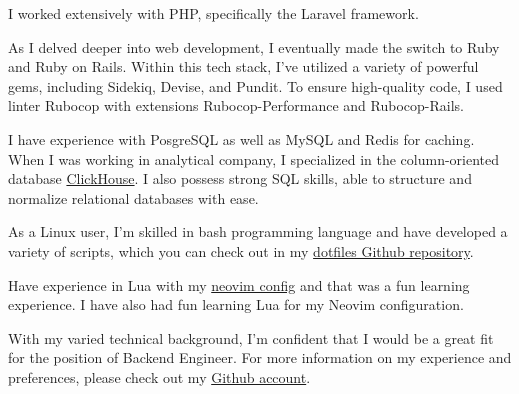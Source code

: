
\begin{cvparagraph}

I worked extensively with PHP, specifically the Laravel framework. 

As I delved deeper into web development, I eventually made the switch to Ruby and Ruby on Rails.
Within this tech stack, I've utilized a variety of powerful gems, including Sidekiq, Devise, and Pundit. 
To ensure high-quality code, I used linter Rubocop with extensions Rubocop-Performance and Rubocop-Rails.

I have experience with PosgreSQL as well as MySQL and Redis for caching.
When I was working in analytical company, I specialized in the column-oriented database \href{https://clickhouse.com/}{ClickHouse}.
I also possess strong SQL skills, able to structure and normalize relational databases with ease.

As a Linux user, I'm skilled in bash programming language and have developed a variety
of scripts, which you can check out in my \href{https://github.com/wittyjudge/dotfiles/tree/master/.local/bin}{dotfiles Github repository}.

Have experience in Lua with my \href{https://github.com/WIttyJudge/dotfiles/tree/master/.config/nvim}{neovim config} and that was a fun learning experience.
I have also had fun learning Lua for my Neovim configuration.

With my varied technical background, I'm confident that I would be a great fit for the position of Backend Engineer.
For more information on my experience and preferences, please check out my \href{https://github.com/wittyjudge}{Github account}.

\end{cvparagraph}
